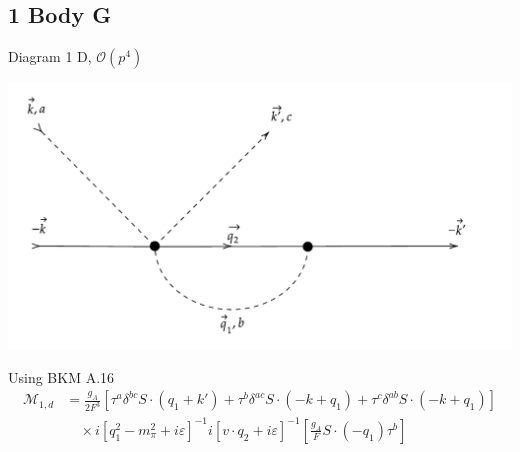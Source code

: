 \documentclass[11pt]{article}
\newcommand\mo{\mathcal{O}}
\newcommand\mm{\mathcal{M}}
\begin{document}
\subsection{1 Body G}
Diagram 1 D, $\mo(p^4)$
\begin{center}
    \includegraphics[scale=0.7]{1g.pdf}
\end{center}
Using BKM A.16
\begin{align}
    \mm_{1,d}&= \frac{g_A}{2F^3}  \left[ \tau^a \delta^{bc} S \cdot \left( q_1+k' \right)+ \tau^b \delta^{ac} S\cdot (-k+q_1) + \tau^c \delta^{ab} S\cdot(-k+q_1)\right]\nonumber\\
           &\quad\times i \left[ q_1^2 -m_{\pi}^2 +i \varepsilon \right]^{-1}
           i\left[v\cdot q_2 + i \varepsilon \right]^{-1}
           \left[ \frac{g_A}{F} S \cdot (-q_1) \tau^b\right]
\end{align}
\newpage
\end{document}
